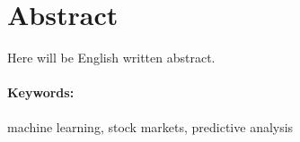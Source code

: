\documentclass[12pt, oneside]{book}  %
\begin{document}
\section*{Abstract}

Here will be English written abstract.


\paragraph*{Keywords:}  machine learning, stock markets, predictive analysis


%
%
%
%



\cleardoublepage 

\tableofcontents



\newpage 

\listoffigures
\listoftables


\mainmatter
\pagestyle{headings}

 









%



\newpage	

\backmatter

\thispagestyle{empty}
\clearpage
{}

 



%

\end{document}
